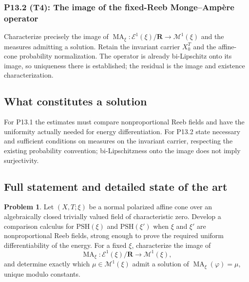 \documentclass[11pt,a4paper]{article}
\theoremstyle{definition}
\newtheorem{problem}{Problem}[section]
\theoremstyle{remark}
\newcommand{\PSH}{\mathrm{PSH}}
\DeclareMathOperator{\MA}{MA}
\begin{document}
\subsubsection*{P13.2 (T4): The image of the fixed-Reeb Monge--Ampère operator}
\label{atom:P13.2}
Characterize precisely the image of \(\MA_\xi:\mathcal E^1(\xi)/\mathbf R\to\mathcal M^1(\xi)\) and the measures admitting a solution. Retain the invariant carrier \(X_0^T\) and the affine-cone probability normalization. The operator is already bi-Lipschitz onto its image, so uniqueness there is established; the residual is the image and existence characterization.

\subsection{What constitutes a solution}
For P13.1 the estimates must compare nonproportional Reeb fields and have the uniformity actually needed for energy differentiation. For P13.2 state necessary and sufficient conditions on measures on the invariant carrier, respecting the existing probability convention; bi-Lipschitzness onto the image does not imply surjectivity.

\subsection{Full statement and detailed state of the art}
\label{sec:ch72-affine-cones}

\begin{problem}\label{prob:frontier-affine-cone-ma}
Let \((X,T;\xi)\) be a normal polarized affine cone over an algebraically
closed trivially valued field of characteristic zero.  Develop a comparison
calculus for \(\PSH(\xi)\) and \(\PSH(\xi')\) when \(\xi\) and \(\xi'\) are
nonproportional Reeb fields, strong enough to prove the required uniform
differentiability of the energy.  For a fixed \(\xi\), characterize the image
of
\[
 \MA_\xi:\mathcal E^1(\xi)/\mathbf R
 \longrightarrow \mathcal M^1(\xi),
\]
and determine exactly which \(\mu\in\mathcal M^1(\xi)\) admit a solution of
\(\MA_\xi(\varphi)=\mu\), unique modulo constants.
\end{problem}
\end{document}
